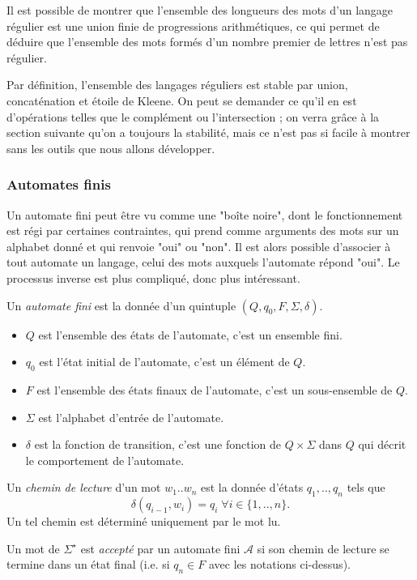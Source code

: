 Il est possible de montrer que l'ensemble des longueurs des mots d'un langage régulier est une union finie de progressions arithmétiques, ce qui permet de déduire que l'ensemble des mots formés d'un nombre premier de lettres n'est pas régulier.

Par définition, l'ensemble des langages réguliers est stable par union, concaténation et étoile de Kleene. On peut se demander ce qu'il en est d'opérations telles que le complément ou l'intersection ; on verra grâce à la section suivante qu'on a toujours la stabilité, mais ce n'est pas si facile à montrer sans les outils que nous allons développer.



\subsubsection{Automates finis}
Un automate fini peut être vu comme une "boîte noire", dont le fonctionnement est régi par certaines contraintes, qui prend comme arguments des mots sur un alphabet donné et qui renvoie "oui" ou "non". Il est alors possible d'associer à tout automate un langage, celui des mots auxquels l'automate répond "oui". Le processus inverse est plus compliqué, donc plus intéressant.

\begin{dfn}
Un \emph{automate fini} est la donnée d'un quintuple $(Q,q_0,F,\Sigma,\delta)$.
\begin{itemize}
\item $Q$ est l'ensemble des états de l'automate, c'est un ensemble fini.
\item $q_0$ est l'état initial de l'automate, c'est un élément de $Q$.
\item $F$ est l'ensemble des états finaux de l'automate, c'est un sous-ensemble de $Q$.
\item $\Sigma$ est l'alphabet d'entrée de l'automate.
\item $\delta$ est la fonction de transition, c'est une fonction de $Q\times\Sigma$ dans $Q$ qui décrit le comportement de l'automate.
\end{itemize}

Un \emph{chemin de lecture} d'un mot $w_1..w_n$ est la donnée d'états $q_1,..,q_n$ tels que
\[\delta(q_{i-1},w_i)=q_i\;\forall i\in \{1,..,n\}.\]
Un tel chemin est déterminé uniquement par le mot lu.

Un mot de $\Sigma^\star$ est \emph{accepté} par un automate fini $\mathcal{A}$ si son chemin de lecture se termine dans un état final (i.e. si $q_n\in F$ avec les notations ci-dessus).
\end{dfn}

